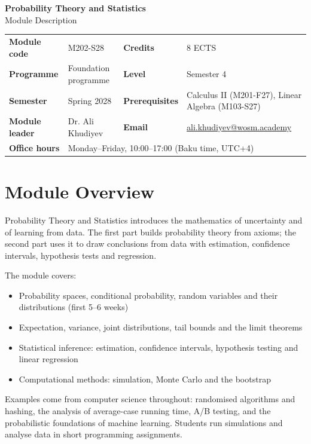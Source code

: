 \documentclass[11pt,a4paper]{article}
\makeatletter
\newcommand{\ModuleTitle}{Probability Theory and Statistics}
\newcommand{\ModuleCode}{M202-S28}
\newcommand{\Programme}{Foundation programme}
\newcommand{\Level}{Semester 4}
\newcommand{\Semester}{Spring 2028}
\newcommand{\Credits}{8 ECTS}
\newcommand{\ModuleLeader}{Dr. Ali Khudiyev}
\newcommand{\Email}{ali.khudiyev@wosm.academy}
\newcommand{\OfficeHours}{Monday--Friday, 10:00--17:00 (Baku time, UTC+4)}
\newcommand{\Prerequisites}{Calculus II (M201-F27), Linear Algebra (M103-S27)}
\makeatother
\begin{document}
\begin{center}
  {\LARGE\bfseries\color{accent} \ModuleTitle}\\[4pt]
  {\large Module Description}
\end{center}
\vspace{6pt}

\begin{tabularx}{\textwidth}{>{\bfseries}l X >{\bfseries}l X}
\toprule
Module code   & \ModuleCode    & Credits      & \Credits \\
Programme     & \Programme     & Level        & \Level \\
Semester      & \Semester      & Prerequisites & \Prerequisites \\
Module leader & \ModuleLeader  & Email        & \href{mailto:\Email}{\Email} \\
Office hours  & \multicolumn{3}{l}{\OfficeHours} \\
\bottomrule
\end{tabularx}

\section{Module Overview}
Probability Theory and Statistics introduces the mathematics of uncertainty and
of learning from data. The first part builds probability theory from axioms;
the second part uses it to draw conclusions from data with estimation, confidence
intervals, hypothesis tests and regression.

The module covers:
\begin{itemize}
  \item Probability spaces, conditional probability, random variables and their
        distributions (first 5--6 weeks)
  \item Expectation, variance, joint distributions, tail bounds and the limit
        theorems
  \item Statistical inference: estimation, confidence intervals, hypothesis testing
        and linear regression
  \item Computational methods: simulation, Monte Carlo and the bootstrap
\end{itemize}

Examples come from computer science throughout: randomised algorithms and hashing,
the analysis of average-case running time, A/B testing, and the probabilistic
foundations of machine learning. Students run simulations and analyse data in
short programming assignments.
\end{document}
